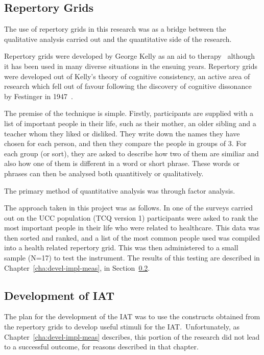 \subsection{Repertory Grids}

The use of repertory grids in this research was as a bridge between the qualitative analysis carried out and the quantitative side of the research. 

Repertory grids were developed by George Kelly as an aid to therapy~\cite{kelly2003psychology} although it has been used in many diverse situations in the ensuing years. 
Repertory grids were developed out of Kelly's theory of cognitive consistency, an active area of research which fell out of favour following the discovery of cognitive dissonance by Festinger in 1947~\cite{greenwald2002}.

The premise of the technique is simple. Firstly, participants are supplied with a list of important people in their life, such as their mother, an older sibling and a teacher whom they liked or disliked. They write down the names they have chosen for each person, and then they compare the people in groups of 3. For each group (or sort), they are asked to describe how two of them are similiar and also how one of them is different in a word or short phrase. These words or phrases can then be analysed both quantitively or qualitatively.

The primary method of quantitative analysis was through factor analysis.

The approach taken in this project was as follows. In one of the surveys carried out on the UCC population (TCQ version 1) participants were asked to rank the most important people in their life who were related to healthcare. 
This data was then sorted and ranked, and a list of the most common people used was compiled into a health related repertory grid. 
This was then administered to a small sample (N=17) to test the instrument. 
 The results of this testing are described in Chapter~\ref{cha:devel-impl-meas}, in Section~\ref{sec:development-iat}.

\subsection{Development of IAT}
\label{sec:development-iat}

The plan for the development of the IAT was to use the constructs obtained from the repertory grids to develop useful stimuli for the IAT.\
Unfortunately, as Chapter~\ref{cha:devel-impl-meas} describes, this portion of the research did not lead to a successful outcome, for reasons described in that chapter.

